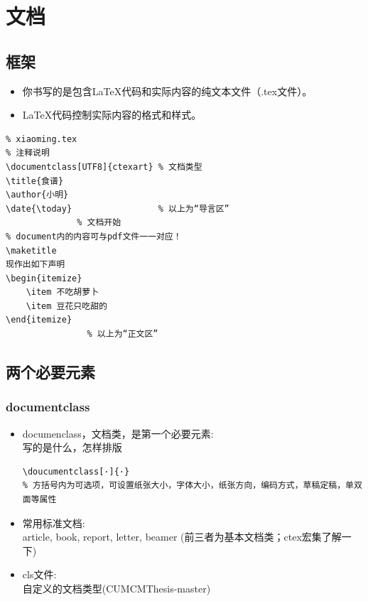\section{文档}

\subsection{框架}

    \begin{frame}[fragile]
        \begin{itemize}
            \item 你书写的是包含LaTeX代码和实际内容的纯文本文件（.tex文件）。
            \item LaTeX代码控制实际内容的格式和样式。
        \end{itemize}
    \end{frame}

	\begin{frame}[fragile]
\begin{lstlisting}
% xiaoming.tex
% 注释说明
\documentclass[UTF8]{ctexart} % 文档类型
\title{食谱}
\author{小明}
\date{\today}                 % 以上为“导言区”
              % 文档开始
% document内的内容可与pdf文件一一对应！
\maketitle
现作出如下声明
\begin{itemize}
    \item 不吃胡萝卜
    \item 豆花只吃甜的
\end{itemize}
                % 以上为“正文区”
\end{lstlisting}
	\end{frame}


\subsection{两个必要元素}%
	\begin{frame}[fragile]
	    \frametitle{documentclass}
		\begin{itemize}
			\item documenclass，文档类，是第一个必要元素:\\
			写的是什么，怎样排版
\begin{lstlisting}
\doucumentclass[·]{·}
% 方括号内为可选项，可设置纸张大小，字体大小，纸张方向，编码方式，草稿定稿，单双面等属性
\end{lstlisting}\pause
			\item 常用标准文档:\\
			article, book, report, letter, beamer (前三者为基本文档类；ctex宏集了解一下)
			\item cls文件:\\
			自定义的文档类型(CUMCMThesis-master)
		\end{itemize}
	\end{frame}
	
